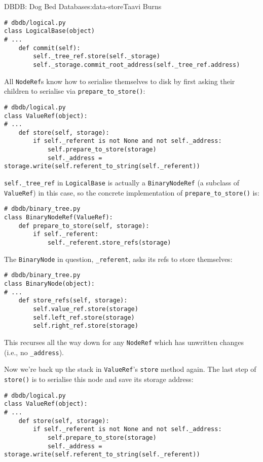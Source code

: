 \begin{aosachapter}{DBDB: Dog Bed Database}{s:data-store}{Taavi Burns}
\begin{verbatim}
# dbdb/logical.py
class LogicalBase(object)
# ...
    def commit(self):
        self._tree_ref.store(self._storage)
        self._storage.commit_root_address(self._tree_ref.address)
\end{verbatim}

All \texttt{NodeRef}s know how to serialise themselves to disk by first
asking their children to serialise via \texttt{prepare\_to\_store()}:

\begin{verbatim}
# dbdb/logical.py
class ValueRef(object):
# ...
    def store(self, storage):
        if self._referent is not None and not self._address:
            self.prepare_to_store(storage)
            self._address = storage.write(self.referent_to_string(self._referent))
\end{verbatim}

\texttt{self.\_tree\_ref} in \texttt{LogicalBase} is actually a
\texttt{BinaryNodeRef} (a subclass of \texttt{ValueRef}) in this case,
so the concrete implementation of \texttt{prepare\_to\_store()} is:

\begin{verbatim}
# dbdb/binary_tree.py
class BinaryNodeRef(ValueRef):
    def prepare_to_store(self, storage):
        if self._referent:
            self._referent.store_refs(storage)
\end{verbatim}

The \texttt{BinaryNode} in question, \texttt{\_referent}, asks its refs
to store themselves:

\begin{verbatim}
# dbdb/binary_tree.py
class BinaryNode(object):
# ...
    def store_refs(self, storage):
        self.value_ref.store(storage)
        self.left_ref.store(storage)
        self.right_ref.store(storage)
\end{verbatim}

This recurses all the way down for any \texttt{NodeRef} which has
unwritten changes (i.e., no \texttt{\_address}).

Now we're back up the stack in \texttt{ValueRef}'s \texttt{store} method
again. The last step of \texttt{store()} is to serialise this node and
save its storage address:

\begin{verbatim}
# dbdb/logical.py
class ValueRef(object):
# ...
    def store(self, storage):
        if self._referent is not None and not self._address:
            self.prepare_to_store(storage)
            self._address = storage.write(self.referent_to_string(self._referent))
\end{verbatim}


\end{aosachapter}
